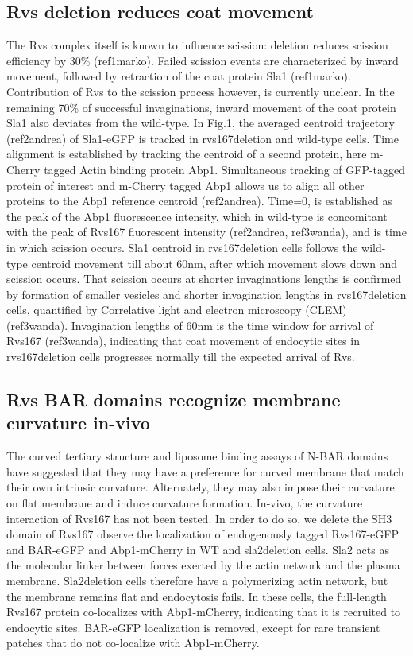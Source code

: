 \documentclass[9pt,lineno]{elife}
\begin{document}
\subsection{Rvs deletion reduces coat movement}
The Rvs complex itself is known to influence scission: deletion reduces scission efficiency by 30\% (ref1marko). Failed scission events are characterized by inward movement, followed by retraction of the coat protein Sla1 (ref1marko). Contribution of Rvs to the scission process however, is currently unclear. In the remaining 70\% of successful invaginations, inward movement of the coat protein Sla1 also deviates from the wild-type. In Fig.1, the averaged centroid trajectory (ref2andrea) of Sla1-eGFP is tracked in rvs167deletion and wild-type cells. Time alignment is established by tracking the centroid of a second protein, here m-Cherry tagged Actin binding protein Abp1. Simultaneous tracking of GFP-tagged protein of interest and m-Cherry tagged Abp1 allows us to align all other proteins to the Abp1 reference centroid (ref2andrea). Time=0, is established as the peak of the Abp1 fluorescence intensity, which in wild-type is concomitant with the peak of Rvs167 fluorescent intensity (ref2andrea, ref3wanda), and is time in which scission occurs. Sla1 centroid in rvs167deletion cells follows the wild-type centroid movement till about 60nm, after which movement slows down and scission occurs. That scission occurs at shorter invaginations lengths is confirmed by formation of smaller vesicles and shorter invagination lengths in rvs167deletion cells, quantified by Correlative light and electron microscopy (CLEM) (ref3wanda). Invagination lengths of 60nm is the time window for arrival of Rvs167 (ref3wanda), indicating that coat movement of endocytic sites in rvs167deletion cells progresses normally till the expected arrival of Rvs. 


\subsection{Rvs BAR domains recognize membrane curvature in-vivo}
The curved tertiary structure and liposome binding assays of N-BAR domains have suggested that they may have a preference for curved membrane that match their own intrinsic curvature. Alternately, they may also impose their curvature on flat membrane and induce curvature formation. In-vivo, the curvature interaction of Rvs167 has not been tested. In order to do so, we delete the SH3 domain of Rvs167 observe the localization of endogenously tagged Rvs167-eGFP and BAR-eGFP and Abp1-mCherry in WT and sla2deletion cells. Sla2 acts as the molecular linker between forces exerted by the actin network and the plasma membrane. Sla2deletion cells therefore have a polymerizing actin network, but the membrane remains flat and endocytosis fails. In these cells, the full-length Rvs167 protein co-localizes with Abp1-mCherry, indicating that it is recruited to endocytic sites. BAR-eGFP localization is removed, except for rare transient patches that do not co-localize with Abp1-mCherry. 
\end{document}
